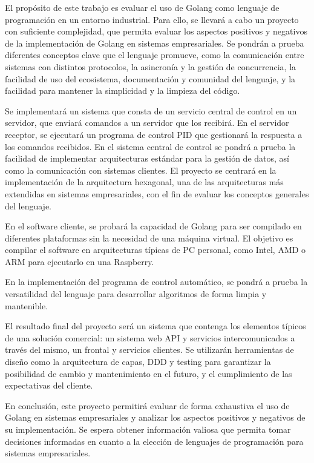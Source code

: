 
El propósito de este trabajo es evaluar el uso de Golang como lenguaje de programación en un entorno industrial. Para ello, se llevará a cabo un proyecto con suficiente complejidad, que permita evaluar los aspectos positivos y negativos de la implementación de Golang en sistemas empresariales. Se pondrán a prueba diferentes conceptos clave que el lenguaje promueve, como la comunicación entre sistemas con distintos protocolos, la asincronía y la gestión de concurrencia, la facilidad de uso del ecosistema, documentación y comunidad del lenguaje, y la facilidad para mantener la simplicidad y la limpieza del código.

Se implementará un sistema que consta de un servicio central de control en un servidor, que enviará comandos a un servidor que los recibirá. En el servidor receptor, se ejecutará un programa de control PID que gestionará la respuesta a los comandos recibidos. En el sistema central de control se pondrá a prueba la facilidad de implementar arquitecturas estándar para la gestión de datos, así como la comunicación con sistemas clientes. El proyecto se centrará en la implementación de la arquitectura hexagonal, una de las arquitecturas más extendidas en sistemas empresariales, con el fin de evaluar los conceptos generales del lenguaje.

En el software cliente, se probará la capacidad de Golang para ser compilado en diferentes plataformas sin la necesidad de una máquina virtual. El objetivo es compilar el software en arquitecturas típicas de PC personal, como Intel, AMD o ARM para ejecutarlo en una Raspberry.

En la implementación del programa de control automático, se pondrá a prueba la versatilidad del lenguaje para desarrollar algoritmos de forma limpia y mantenible.

El resultado final del proyecto será un sistema que contenga los elementos típicos de una solución comercial: un sistema web API y servicios intercomunicados a través del mismo, un frontal y servicios clientes. Se utilizarán herramientas de diseño como la arquitectura de capas, DDD y testing para garantizar la posibilidad de cambio y mantenimiento en el futuro, y el cumplimiento de las expectativas del cliente.

En conclusión, este proyecto permitirá evaluar de forma exhaustiva el uso de Golang en sistemas empresariales y analizar los aspectos positivos y negativos de su implementación. Se espera obtener información valiosa que permita tomar decisiones informadas en cuanto a la elección de lenguajes de programación para sistemas empresariales.